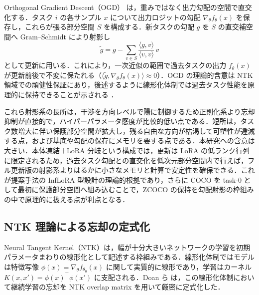 Orthogonal Gradient Descent（OGD）\cite{ogd} は，重みではなく出力勾配の空間で直交化する．タスク $i$ の各サンプル $x$ について出力ロジットの勾配 $\nabla_\theta f_\theta(x)$ を保存し，これらが張る部分空間 $S$ を構成する．新タスクの勾配 $g$ を $S$ の直交補空間へ Gram--Schmidt により射影し
\begin{equation}
\tilde{g}=g-\sum_{v\in S}\frac{\langle g,v\rangle}{\langle v,v\rangle}\,v
\end{equation}
として更新に用いる．これにより，一次近似の範囲で過去タスクの出力 $f_\theta(x)$ が更新前後で不変に保たれる（$\langle\tilde g,\nabla_\theta f_\theta(x)\rangle\approx 0$）．OGD の理論的含意は NTK 領域での頑健性保証にあり，後述するように線形化体制では過去タスク性能を原理的に保持できることが示される \cite{ntkoverlap}．

これら射影系の長所は，干渉を方向レベルで陽に制御するため正則化系より忘却抑制が直接的で，ハイパーパラメータ感度が比較的低い点である．短所は，タスク数増大に伴い保護部分空間が拡大し，残る自由な方向が枯渇して可塑性が逓減する点，および基底や勾配の保存にメモリを要する点である．本研究への含意は大きい．本体凍結＋LoRA 分岐という構成では，更新は LoRA の低ランク行列に限定されるため，過去タスク勾配との直交化を低次元部分空間内で行えば，フル更新版の射影系よりはるかに小さなメモリと計算で安定性を確保できる．これが提案手法の InfLoRA 型設計の理論的根拠であり，さらに COCO を task-0 として最初に保護部分空間へ組み込むことで，ZCOCO の保持を勾配射影の枠組みの中で原理的に扱える点が利点となる．

\subsection{NTK 理論による忘却の定式化}

Neural Tangent Kernel（NTK）は，幅が十分大きいネットワークの学習を初期パラメータまわりの線形化として記述する枠組みである．線形化体制ではモデルは特徴写像 $\phi(x)=\nabla_\theta f_{\theta_0}(x)$ に関して実質的に線形であり，学習はカーネル $K(x,x')=\phi(x)^{\top}\phi(x')$ に支配される．Doan ら \cite{ntkoverlap} は，この線形化体制において継続学習の忘却を NTK overlap matrix を用いて厳密に定式化した．

